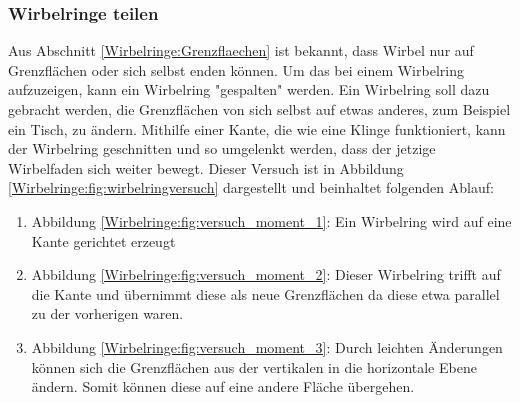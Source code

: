 \subsubsection{Wirbelringe teilen}

Aus Abschnitt \ref{Wirbelringe:Grenzflaechen} ist bekannt, dass Wirbel nur auf Grenzflächen oder sich selbst enden können. 
Um das bei einem Wirbelring aufzuzeigen, kann ein Wirbelring "gespalten" werden. 
Ein Wirbelring soll dazu gebracht werden, die Grenzflächen von sich selbst auf etwas anderes, zum Beispiel ein Tisch, zu ändern. 
Mithilfe einer Kante, die wie eine Klinge funktioniert, kann der Wirbelring geschnitten und so umgelenkt werden, dass der jetzige Wirbelfaden sich weiter bewegt. 
Dieser Versuch ist in Abbildung \ref{Wirbelringe:fig:wirbelringversuch} dargestellt und beinhaltet folgenden Ablauf:



\begin{enumerate}
    \item Abbildung \ref{Wirbelringe:fig:versuch_moment_1}: Ein Wirbelring wird auf eine Kante gerichtet erzeugt
    \item Abbildung \ref{Wirbelringe:fig:versuch_moment_2}: Dieser Wirbelring trifft auf die Kante und übernimmt diese als neue Grenzflächen da diese etwa parallel zu der vorherigen waren.
    \item Abbildung \ref{Wirbelringe:fig:versuch_moment_3}: Durch leichten Änderungen können sich die Grenzflächen aus der vertikalen in die horizontale Ebene ändern.
    Somit können diese auf eine andere Fläche übergehen.
\end{enumerate}
    
